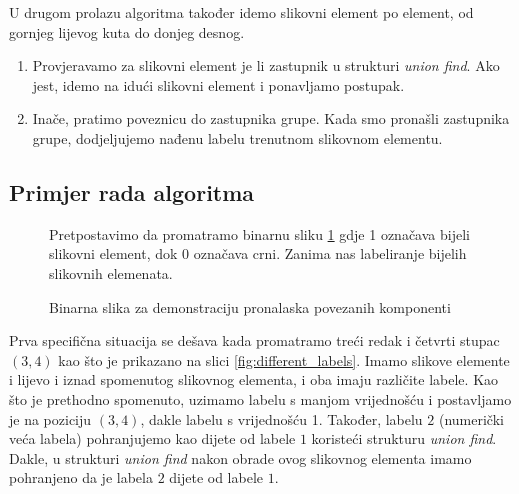 \documentclass[times, utf8, diplomski]{fer}
\theoremstyle{definition}
\begin{document}
U drugom prolazu algoritma također idemo slikovni element po element, od gornjeg lijevog kuta do donjeg desnog.
\begin{enumerate}
\item Provjeravamo za slikovni element je li zastupnik u strukturi \textit{union find}. Ako jest, idemo na idući slikovni element i ponavljamo postupak.
\item Inače, pratimo poveznicu do zastupnika grupe. Kada smo pronašli zastupnika grupe, dodjeljujemo nađenu labelu trenutnom slikovnom elementu.
\end{enumerate}
\subsection{Primjer rada algoritma}
\begin{figure}[H]
	Pretpostavimo da promatramo binarnu sliku \ref{fig:binary_image} gdje 1 označava bijeli slikovni element, dok 0 označava crni. Zanima nas labeliranje bijelih slikovnih elemenata.
\begin{center}
\end{center}
\caption{Binarna slika za demonstraciju pronalaska povezanih komponenti}
\label{fig:binary_image}
\end{figure}
Prva specifična situacija se dešava kada promatramo treći redak i četvrti stupac $(3,4)$ kao što je prikazano na slici \ref{fig:different_labels}. Imamo slikove elemente i lijevo i iznad spomenutog slikovnog elementa, i oba imaju različite labele. Kao što je prethodno spomenuto, uzimamo labelu s manjom vrijednošću i postavljamo je na poziciju $(3,4)$, dakle labelu s vrijednošću 1. Također, labelu $2$ (numerički veća labela) pohranjujemo kao dijete od labele $1$ koristeći strukturu \textit{union find}. Dakle, u strukturi \textit{union find} nakon obrade ovog slikovnog elementa imamo pohranjeno da je labela $2$ dijete od labele $1$.
\end{document}
